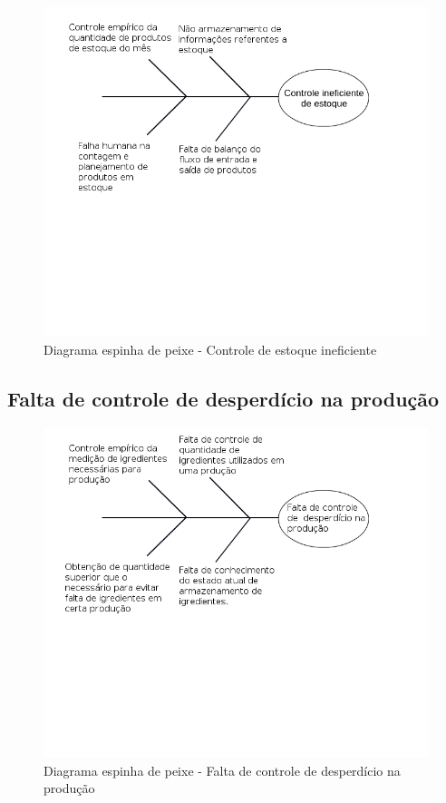 \begin{figure}[!htpb]
		\centering
		\includegraphics[scale=0.45]{figuras/analise_do_problema/fishbone_problema1}
		\caption{Diagrama espinha de peixe - Controle de estoque ineficiente}
\end{figure}

\subsection{Falta de controle de desperdício na produção}

\begin{figure}[!htpb]
		\centering
		\includegraphics[scale=0.45]{figuras/analise_do_problema/fishbone_problema2}
		\caption{Diagrama espinha de peixe - Falta de controle de desperdício na produção}
\end{figure}
